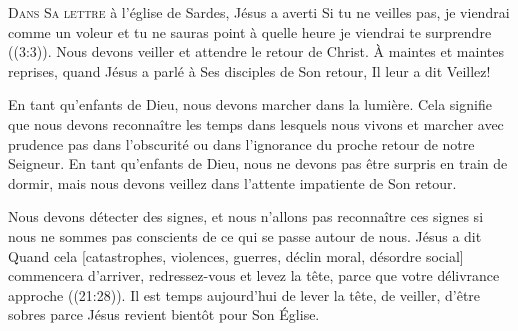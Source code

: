



\lettrine{D}{ans Sa lettre} à l'église de Sardes,
 Jésus a averti\frcolon{} 
 \Og Si tu ne veilles pas, je viendrai comme un voleur et tu ne sauras point
 à quelle heure je viendrai te surprendre \Fg{} ((3:3)).
 Nous devons veiller et attendre le retour de Christ.
 À maintes et maintes reprises, quand Jésus a parlé à Ses disciples
 de Son retour, Il leur a dit\frcolon{}  \Og Veillez! \Fg{}


En tant qu'enfants de Dieu, nous devons marcher dans la lumière.
 Cela signifie que nous devons reconnaître les temps dans lesquels nous vivons
 et marcher avec prudence \ocadr pas dans l'obscurité ou dans l'ignorance
 du proche retour de notre Seigneur. En tant qu'enfants de Dieu,
 nous ne devons pas être surpris en train de dormir,
 mais nous devons veillez dans l'attente impatiente de Son retour.

Nous devons détecter des signes, et nous n'allons pas reconnaître ces signes
 si nous ne sommes pas conscients de ce qui se passe autour de nous.
 Jésus a dit\frcolon{} 
 \Og Quand cela [catastrophes, violences, guerres, déclin moral,
 désordre social] commencera d'arriver, redressez-vous et levez la tête,
 parce que votre délivrance approche \Fg{} ((21:28)).
 Il est temps aujourd'hui de lever la tête, de veiller, d'être sobres
 \ocadr parce Jésus revient bientôt pour Son Église.

\dvrule






